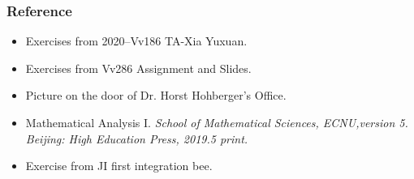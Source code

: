 \documentclass{beamer}
\newcommand{\myfont}{\rmfamily\normalsize\upshape\mdseries}
\begin{document}
\begin{frame}
    \frametitle{Reference}
    \begin{itemize}
        \item Exercises from 2020--Vv186 TA-Xia Yuxuan.
        \item Exercises from Vv286 Assignment and Slides.
        \item Picture on the door of Dr. Horst Hohberger's Office.
        \item Mathematical Analysis I. \itshape School of Mathematical Sciences, ECNU,\myfont version 5. 
        Beijing: High Education Press, 2019.5 print.
        \item Exercise from JI first integration bee.
    \end{itemize}
\end{frame}
\end{document}
